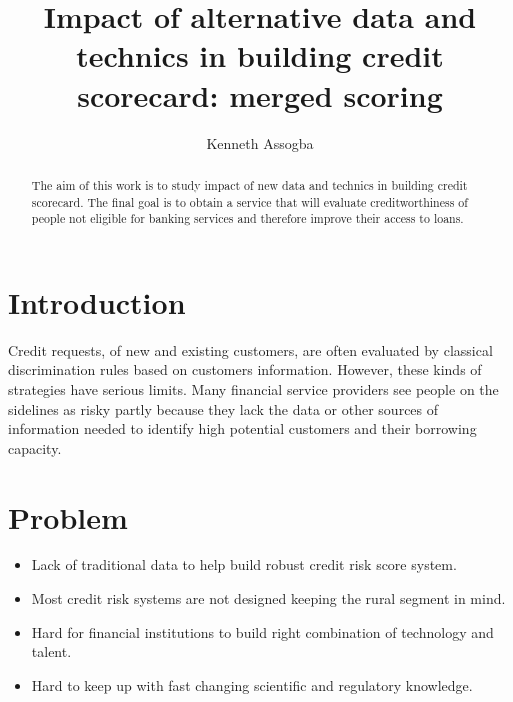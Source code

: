 \documentclass[12pt,a4paper]{amsart}
\numberwithin{equation}{section}
\theoremstyle{plain}
\theoremstyle{definition}
\begin{document}
\title{Impact of alternative data and technics in building credit scorecard: merged scoring}


\author[\\]{Kenneth Assogba}

\address{}





















\begin{abstract}
The aim of this work is to study impact of new data and technics in building credit scorecard.
The final goal is to obtain a service that will evaluate creditworthiness of people not eligible for banking services 
and therefore improve their access to loans.
\end{abstract}

\maketitle

\section{Introduction} Credit requests, of new and existing customers, are
often evaluated by classical discrimination rules based on customers information. However, these kinds of strategies have serious limits.
Many financial service providers see people on the sidelines as risky partly because
they lack the data or other sources of information needed to identify high potential customers and their borrowing capacity.



\section{Problem}
\begin{itemize}
 \item Lack of traditional data to help build robust credit risk score system.
 \item Most credit risk systems are not designed keeping the rural segment in mind.
 \item Hard for financial institutions to build right combination of technology and talent.
 \item Hard to keep up with fast changing scientific and regulatory knowledge.
\end{itemize}
\end{document}
